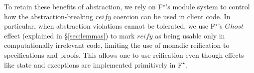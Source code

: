 \documentclass[sigplan,screen]{acmart}\settopmatter{}
\newcommand\fstar{F$^\star$\xspace}
\newcommand{\comm}[3]{\ifcheckpagebudget\else\ifdraft{\maybecolor{#1}[#2: #3]}\fi\fi}
\newcommand{\ch}[1]{\comm{teal}{CH}{#1}}
\newcommand{\chfoot}[1]{\ifdraft\footnote{\comm{teal}{CH}{#1}}\fi}
\begin{document}
To retain these benefits of abstraction, we rely on \fstar's module
system to control how the abstraction-breaking \ls$reify$ coercion
can be used in client code.
%
In particular, when abstraction violations cannot be tolerated, we
use \fstar's \ls$Ghost$ effect (explained in
\S\ref{sec:lemmas}) to mark \ls$reify$
as being usable only in computationally irrelevant code, limiting the use
of monadic reification to specifications and proofs.
%
This allows one to use reification even though effects like state and
exceptions are implemented primitively in \fstar.


%
%
\end{document}
